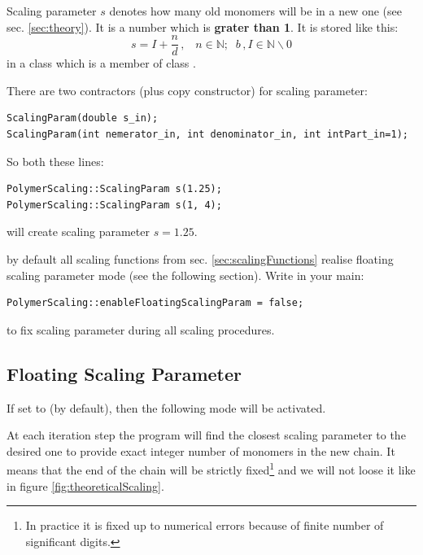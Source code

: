 \documentclass[12pt]{article}
\begin{document}
\begin{mySection}
Scaling parameter $s$ denotes how many old monomers will be in a new one (see sec. \ref{sec:theory}). It is a  number which is \textbf{grater than 1}. It is stored like this:
\begin{equation}
s = I+\frac{n}{d}\,,\;\;\; n\in \mathbb{N};\;\;b\,,I\in \mathbb{N}\backslash 0
\end{equation}
in a class  which is a member of class .

There are two contractors (plus copy constructor) for scaling parameter:
\begin{lstlisting}
ScalingParam(double s_in);
ScalingParam(int nemerator_in, int denominator_in, int intPart_in=1);
\end{lstlisting}

So both these lines:
\begin{lstlisting}
PolymerScaling::ScalingParam s(1.25);
PolymerScaling::ScalingParam s(1, 4);
\end{lstlisting}
will create scaling parameter $s = 1.25$.

\important by default all scaling functions from sec. \ref{sec:scalingFunctions} realise floating scaling parameter mode (see the following section). Write in your main:
\begin{lstlisting}
PolymerScaling::enableFloatingScalingParam = false;
\end{lstlisting}
to fix scaling parameter during all scaling procedures.

\subsection{Floating Scaling Parameter}
If  set to  (by default), then the following mode will be activated.

At each iteration step the program will find the closest scaling parameter to the desired one to provide exact integer number of monomers in the new chain. It means that the end of the chain will be strictly fixed\footnote{In practice it is fixed up to numerical errors because of finite number of significant digits.} and we will not loose it like in figure \ref{fig:theoreticalScaling}.  


\end{mySection}
\end{document}
